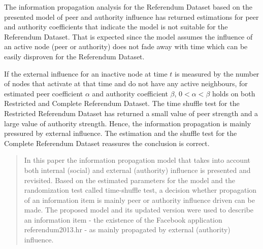 \documentclass[times, utf8, zavrsni]{fer}
\begin{document}
The information propagation analysis for the Referendum Dataset based on the presented model of peer and authority influence has returned estimations for peer and authority coefficients that indicate the model is not suitable for the Referendum Dataset. That is expected since the model assumes the influence of an active node (peer or authority) does not fade away with time which can be easily disproven for the Referendum Dataset.

If the external influence for an inactive node at time $t$ is measured by the number of nodes that activate at that  time and do not have any active neighbours, for estimated peer coefficient $\alpha$ and authority coefficient $\beta$, $0 < \alpha < \beta$ holds on both Restricted and Complete Referendum Dataset. The time shuffle test for the Restricted Referendum Dataset has returned a small value of peer strength and a large value of authority strength. Hence, the information propagation is mainly pressured by external influence. The estimation and the shuffle test for the Complete Referendum Dataset reassures the conclusion is correct. 




\pagebreak
{}
\begin{abstract}
In this paper the information propagation model that takes into account both internal (social) and external (authority) influence is presented and revisited. Based on the estimated parameters for the model and the randomization test called time-shuffle test, a decision whether propagation of an information item is mainly peer or authority influence driven can be made. The proposed model and its updated version were used to describe an information item - the existence of the Facebook application referendum2013.hr - as mainly propagated by external (authority) influence. 

\end{abstract}
\end{document}
